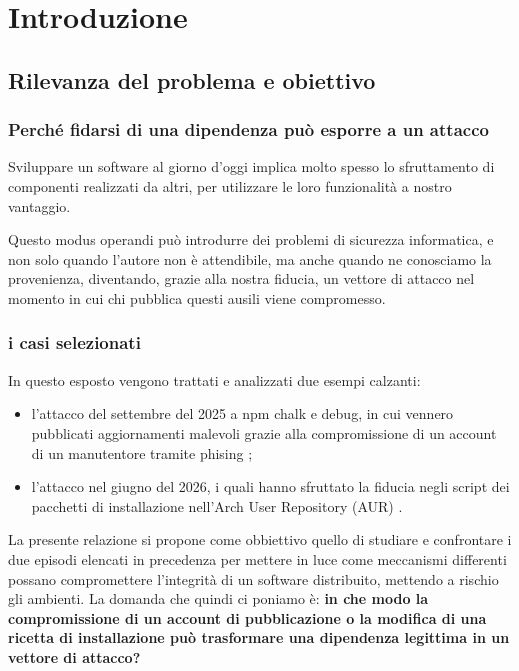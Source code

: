 \section{Introduzione}
\label{sec:introduzione}
\subsection{Rilevanza del problema e obiettivo}
\subsubsection{Perché fidarsi di una dipendenza può esporre a un attacco}

Sviluppare un software al giorno d'oggi implica molto spesso 
lo sfruttamento di componenti realizzati da altri, per utilizzare 
le loro funzionalità a nostro vantaggio.

Questo modus operandi può introdurre dei problemi di sicurezza informatica, 
e non solo quando l’autore non è attendibile, ma anche quando 
ne conosciamo la provenienza, diventando, grazie alla nostra fiducia, 
un vettore di attacco nel momento in cui chi pubblica questi ausili 
viene compromesso.

\subsubsection{i casi selezionati}

In questo esposto vengono trattati e analizzati due esempi calzanti:
\begin{itemize}
    \item[] l’attacco del settembre del 2025 a npm chalk e debug, in cui vennero 
pubblicati aggiornamenti malevoli grazie alla compromissione di 
un account di un manutentore tramite phising \cite{git-commit-npm-attack, npm-attack-check-point};
\item[] l’attacco nel giugno del 2026, i quali hanno sfruttato la fiducia 
negli script dei pacchetti di installazione nell’Arch User Repository (AUR) \cite{arch-aur-incident-2026}.
\end{itemize}

La presente relazione si propone come obbiettivo quello di studiare 
e confrontare i due episodi elencati in precedenza per mettere 
in luce come meccanismi differenti possano compromettere l’integrità 
di un software distribuito, mettendo a rischio gli ambienti.
La domanda che quindi ci poniamo è: 
\textbf{in che modo la compromissione di un account 
di pubblicazione o la modifica di una ricetta di installazione 
può trasformare una dipendenza legittima in un vettore di attacco?}

